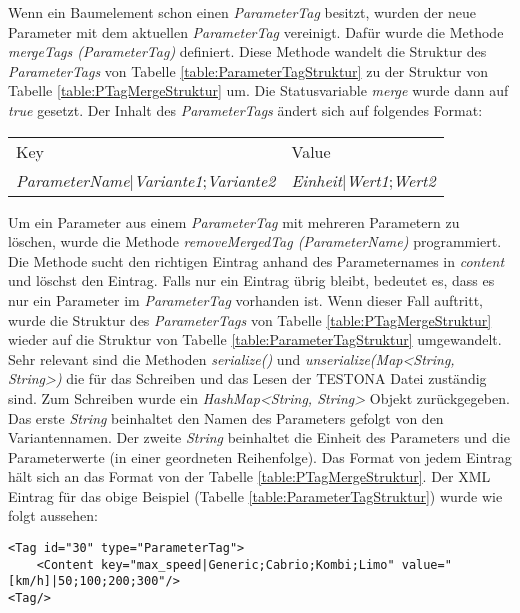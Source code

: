 Wenn ein Baumelement schon einen \textit{ParameterTag} besitzt, wurden der neue Parameter mit dem aktuellen \textit{ParameterTag} vereinigt. Dafür wurde die Methode \textit{mergeTags (ParameterTag)} definiert. Diese Methode wandelt die Struktur des \textit{ParameterTags} von Tabelle \ref{table:ParameterTagStruktur} zu der Struktur von Tabelle \ref{table:PTagMergeStruktur} um. Die Statusvariable \textit{merge} wurde dann auf \textit{true} gesetzt. Der Inhalt des \textit{ParameterTags} ändert sich auf folgendes Format:

\begin{center}
\begin{tabular}{l l}
Key									&Value\\
\textit{ParameterName}|\textit{Variante1};\textit{Variante2}		&\textit{Einheit}|\textit{Wert1};\textit{Wert2}\\
\end{tabular}
\end{center}


Um ein Parameter aus einem \textit{ParameterTag} mit mehreren Parametern zu löschen, wurde die Methode \textit{removeMergedTag (ParameterName)} programmiert. Die Methode sucht den richtigen Eintrag anhand des Parameternames in \textit{content} und löschst den Eintrag. Falls nur ein Eintrag übrig bleibt, bedeutet es, dass es nur ein Parameter im \textit{ParameterTag} vorhanden ist. Wenn dieser Fall auftritt, wurde die Struktur des \textit{ParameterTags} von Tabelle \ref{table:PTagMergeStruktur} wieder auf die Struktur von Tabelle \ref{table:ParameterTagStruktur} umgewandelt.\\


Sehr relevant sind die Methoden \textit{serialize()} und \textit{unserialize(Map<String, String>)} die für das Schreiben und das Lesen der TESTONA Datei zuständig sind. Zum Schreiben wurde ein \textit{HashMap<String, String>} Objekt zurückgegeben. Das erste \textit{String} beinhaltet den Namen des Parameters gefolgt von den Variantennamen. Der zweite \textit{String} beinhaltet die Einheit des Parameters und die Parameterwerte (in einer geordneten Reihenfolge). Das Format von jedem Eintrag hält sich an das Format von der Tabelle \ref{table:PTagMergeStruktur}. Der XML Eintrag für das obige Beispiel (Tabelle \ref{table:ParameterTagStruktur}) wurde wie folgt aussehen:\\

\begin{lstlisting}[caption={XML Darstellung eines ParameterTags}, captionpos=b]
<Tag id="30" type="ParameterTag">
	<Content key="max_speed|Generic;Cabrio;Kombi;Limo" value="[km/h]|50;100;200;300"/>
<Tag/>
\end{lstlisting}



